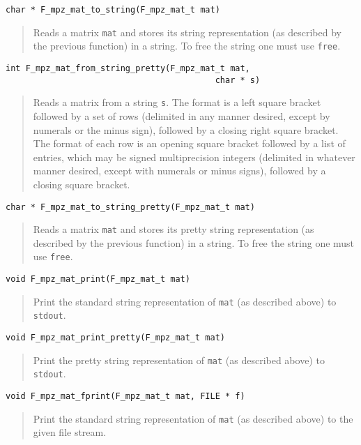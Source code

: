 \documentclass[a4paper,10pt]{article}
\newcommand{\code}{\lstinline}
\begin{document}
\begin{lstlisting}
char * F_mpz_mat_to_string(F_mpz_mat_t mat)
\end{lstlisting}
\begin{quote}
Reads a matrix \code{mat} and stores its string representation (as described by the previous function) in 
a string. To free the string one must use \code{free}.
\end{quote}

\begin{lstlisting}
int F_mpz_mat_from_string_pretty(F_mpz_mat_t mat, 
                                          char * s)
\end{lstlisting}
\begin{quote}
Reads a matrix from a string \code{s}. The format is a left square bracket followed by a set of rows 
(delimited in any manner desired, except by numerals or the minus sign), followed by a closing right
square bracket. The format of each row is an opening square bracket followed by a list of entries, which
may be signed multiprecision integers (delimited in whatever manner desired, except with numerals or 
minus signs), followed by a closing square bracket. 
\end{quote}

\begin{lstlisting}
char * F_mpz_mat_to_string_pretty(F_mpz_mat_t mat)
\end{lstlisting}
\begin{quote}
Reads a matrix \code{mat} and stores its pretty string representation (as described by the previous function) 
in a string. To free the string one must use \code{free}.
\end{quote}

\begin{lstlisting}
void F_mpz_mat_print(F_mpz_mat_t mat)
\end{lstlisting}
\begin{quote}
Print the standard string representation of \code{mat} (as described above) to \code{stdout}.
\end{quote}

\begin{lstlisting}
void F_mpz_mat_print_pretty(F_mpz_mat_t mat)
\end{lstlisting}
\begin{quote}
Print the pretty string representation of \code{mat} (as described above) to \code{stdout}.
\end{quote}

\begin{lstlisting}
void F_mpz_mat_fprint(F_mpz_mat_t mat, FILE * f)
\end{lstlisting}
\begin{quote}
Print the standard string representation of \code{mat} (as described above) to the given file stream.
\end{quote}
\end{document}
